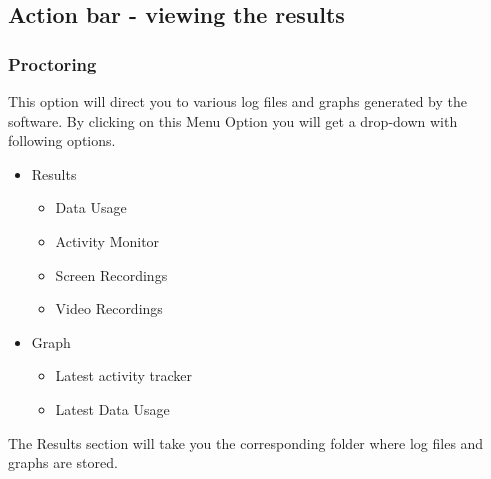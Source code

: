\documentclass{article}
\begin{document}
\subsection{Action bar - viewing the results}
\subsubsection{Proctoring}
This option will direct you to various log files and graphs generated by the software.
By clicking on this Menu Option you will get a drop-down with following options.\\
\begin{itemize}
    \item Results
    {
    \begin{itemize}
        \item Data Usage
        \item Activity Monitor
        \item Screen Recordings
        \item Video Recordings
    \end{itemize}}
    \item Graph
    \begin{itemize}
        \item Latest activity tracker
        \item Latest Data Usage
    \end{itemize}
\end{itemize}
\newpage
The Results section will take you the corresponding folder where log files and graphs are stored.\\
\end{document}
